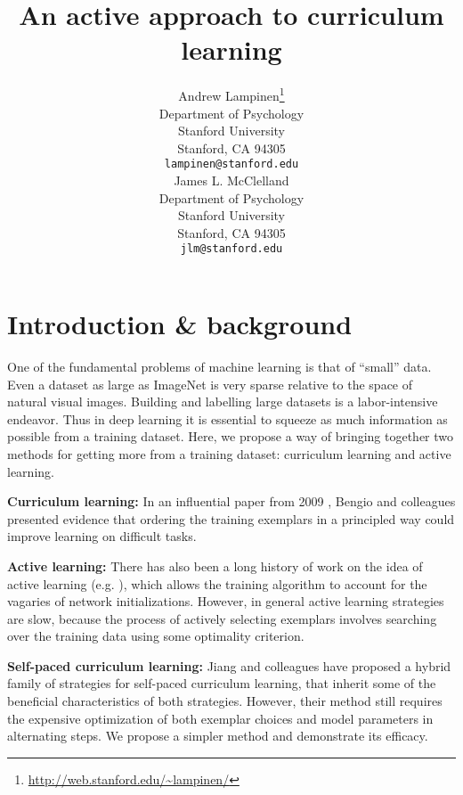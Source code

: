 \documentclass{article}
\title{An active approach to curriculum learning}
\author{
  Andrew Lampinen\thanks{\url{http://web.stanford.edu/\~lampinen/}}  \\
  Department of Psychology\\
  Stanford University\\
  Stanford, CA 94305 \\
  \texttt{lampinen@stanford.edu} \\
  \And
  James L. McClelland \\
  Department of Psychology\\
  Stanford University\\
  Stanford, CA 94305 \\
  \texttt{jlm@stanford.edu} \\
}
\begin{document}

\maketitle


\section{Introduction \& background}
One of the fundamental problems of machine learning is that of ``small'' data. Even a dataset as large as ImageNet 
is very sparse relative to the space of natural visual images. Building and labelling large datasets is a labor-intensive endeavor. Thus in deep learning it is essential to squeeze as much information as possible from a training dataset. Here, we propose a way of bringing together two methods for getting more from a training dataset: curriculum learning and active learning.\par
\textbf{Curriculum learning:} In an influential paper from 2009 \cite{Bengio2009}, Bengio and colleagues presented evidence that ordering the training exemplars in a principled way could improve learning on difficult tasks.  
\par
\textbf{Active learning:} There has also been a long history of work on the idea of active learning (e.g. \cite{Fukumizu2000}), which allows the training algorithm to account for the vagaries of network initializations. However, in general active learning strategies are slow, because the process of actively selecting exemplars involves searching over the training data using some optimality criterion.\par
\textbf{Self-paced curriculum learning:} Jiang and colleagues \cite{Jiang2015} have proposed a hybrid family of strategies for self-paced curriculum learning, that inherit some of the beneficial characteristics of both strategies. However, their method still requires the expensive optimization of both exemplar choices and model parameters in alternating steps. We propose a simpler method and demonstrate its efficacy. 
\end{document}
